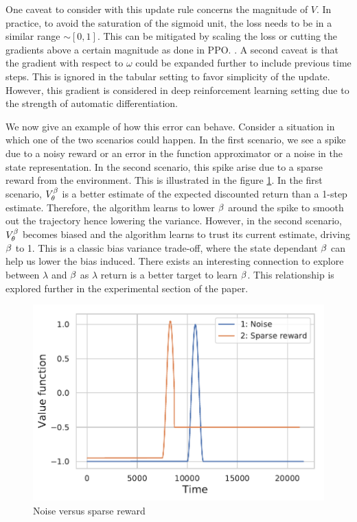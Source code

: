 One caveat to consider with this update rule concerns the magnitude of $V$. In practice, to avoid the saturation of the sigmoid unit, the loss needs to be in a similar range $\sim [0,1]$. This can be mitigated by scaling the loss or cutting the gradients above a certain magnitude as done in PPO. \cite{schulman2017proximal}.
A second caveat is that the gradient with respect to $\omega$ could be expanded further to include previous time steps. This is ignored in the tabular setting to favor simplicity of the update. However, this gradient is considered in deep reinforcement learning setting due to the strength of automatic differentiation.

We now give an example of how this error can behave. Consider a situation in which one of the two scenarios could happen. In the first scenario, we see a spike due to a noisy reward or an error in the function approximator or a noise in the state representation. In the second scenario, this spike arise due to a sparse reward from the environment. This is illustrated in the figure \ref{fig:noise}. In the first scenario, $V^{\beta}_{\theta}$ is a better estimate of the expected discounted return than a 1-step estimate. Therefore, the algorithm learns to lower $\beta$ around the spike to smooth out the trajectory hence lowering the variance. However, in the second scenario, $V^{\beta}_{\theta}$ becomes biased and the algorithm learns to trust its current estimate, driving $\beta$ to 1. This is a classic bias variance trade-off, where the state dependant $\beta$ can help us lower the bias induced. There exists an interesting connection to explore between $\lambda$ and $\beta$ as $\lambda$ return is a better target to learn $\beta$. This relationship is explored further in the experimental section of the paper.
\begin{figure}[h]
    \centering
    \includegraphics[scale=0.5]{fig/noise_sparse.pdf}
    \caption{Noise versus sparse reward}
    \label{fig:noise}
\end{figure}


